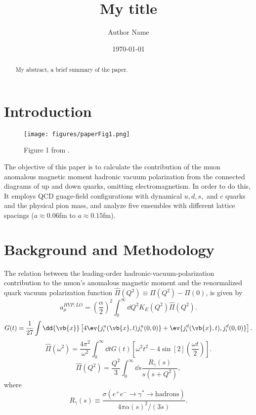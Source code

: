 \documentclass[amsfonts, amssymb, amsmath, preprint, showkeys, nofootinbib,longbibliography]{revtex4-1}
\begin{document}
\linenumbers

\title{\Large My title}

\author{Author Name}

\date{\today} %

\begin{abstract} \normalsize
My abstract, a brief summary of the paper. 

\end{abstract}

\maketitle

\section{Introduction}

\begin{figure}[h]
	\centering
	\texttt{[image: figures/paperFig1.png]}
	\caption{%
		Figure 1 from \cite{Davies_2020}.
	}
	\label{fig: paperFig1}
\end{figure}

The objective of this paper is to calculate the contribution of the muon anomalous magnetic moment hadronic vacuum polarization from the connected diagrams of up and down quarks, omitting electromagnetism.
In order to do this, It employs QCD guage-field configurations with dynamical $u,d,s,$ and $c$ quarks and the physical pion mass, and analyze five ensembles with different lattice spacings ($a \approx 0.06$fm to $a \approx 0.15$fm).

\section{Background and Methodology}
The relation between the leading-order hadronic-vacuum-polarization contribution to the muon’s anomalous magnetic moment and the renormalized quark vacuum polarization function $\hat{\Pi}(Q^2) \equiv \Pi(Q^2) - \Pi(0)$, is given by
\begin{equation}
	a_\mu^{HVP,LO} = \left(\frac{\alpha}{2}\right)^2 \int_0^\infty \dd{Q^2} K_E (Q^2) \hat{\Pi}(Q^2).
\end{equation}
\begin{equation}
	G(t) = \frac{1}{27} \int \dd{\vb{x}} \left[4\ev{j_i^u(\vb{x},t)j_i^u(0,0)} + \ev{j_i^d(\vb{x},t),j_i^d(0,0)}\right].
\end{equation}
\begin{equation}
	\hat{\Pi}(\omega^2) = \frac{4\pi^2}{\omega^2} \int_0^\infty \dd{t} G(t) \left[\omega^2t^2-4\sin[2](\frac{\omega t}{2})\right].
\end{equation}
\begin{equation}
	\hat{\Pi}(Q^2) = \frac{Q^2}{3} \int_0^\infty \dd{s}\frac{R_\gamma(s)}{s(s+Q^2)},
\end{equation}
where
\begin{equation}
	R_\gamma (s) \equiv \frac{\sigma(e^+e^- \rightarrow \gamma^* \rightarrow \text{hadrons})}{4\pi\alpha(s)^2/(3s)}.
\end{equation}
\end{document}
